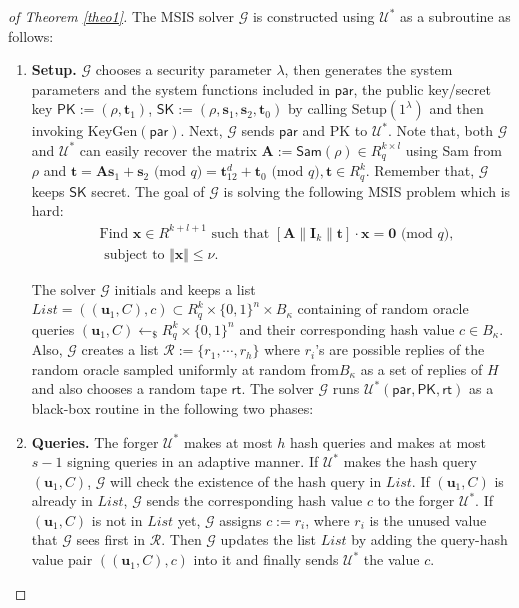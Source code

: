 \documentclass[conference]{IEEEtran}
\newtheorem{proof}{Proof}
\begin{document}
	\begin{proof}[of Theorem \ref{theo1}]
		
		The \textsf{MSIS} solver  $\mathcal{G}$ is constructed using  $\mathcal{U}^*$ as a subroutine as follows:
		\begin{enumerate}
			\item \textbf{Setup.} $\mathcal{G}$ chooses a security parameter $\lambda$, then generates the system parameters and the system functions included in $\mathsf{par}$, the public key/secret key $\textsf{PK}:=(\rho,\mathbf{t}_1)$, $\textsf{SK}:=(\rho,\mathbf{s}_1,\mathbf{s}_2,\mathbf{t}_0)$ by calling \textsf{Setup}$(1^{\lambda})$  and  then invoking \textsf{KeyGen}$(\mathsf{par})$. Next, $\mathcal{G}$ sends $\mathsf{par}$ and \textsf{PK} to $\mathcal{U}^*$. Note that, both $\mathcal{G}$ and $\mathcal{U}^*$ can easily recover the matrix $\mathbf{A}:=\textsf{Sam}(\rho) \in R_q^{k \times l}$ using \textsf{Sam} from $\rho$ and  $\mathbf{t}=\mathbf{A}\mathbf{s}_1+\mathbf{s}_2 \text{ (mod } q)=\mathbf{t}_12^d+\mathbf{t}_0 \text{ (mod } q), \mathbf{t} \in R_q^{k}$. Remember that, $\mathcal{G}$ keeps $\textsf{SK}$ secret.  The goal of $\mathcal{G}$ is solving the following \textsf{MSIS} problem which is hard:
			\begin{equation}\label{k14}
		\begin{split}
			&\text{Find } \mathbf{x}\in R^{k+l+1} \text{ such that } [\mathbf{A}\|\mathbf{I}_{k}\|\mathbf{t}]\cdot \mathbf{x}=\textbf{0} \text{ (mod } q),\\
			& \text{ subject to } \Vert \mathbf{x}\Vert \leq \nu.
		\end{split}
			\end{equation}
			
			The solver $\mathcal{G}$ initials and keeps a list $\textit{List}=((\mathbf{u}_1, C), c) \subset R_q^{k} \times \{0,1\}^n\times B_{\kappa}$ containing of random oracle queries $(\mathbf{u}_1, C)\leftarrow_{\$} R_q^{k} \times \{0,1\}^n$ and their corresponding hash value $ c \in B_{\kappa}$. Also,  $\mathcal{G}$ creates a list $\mathcal{R}:=\{r_1, \cdots, r_{h} \}$ where $r_i$'s are possible replies of the random oracle sampled uniformly at random from$B_{\kappa}$ as a set of replies of $H$ and also chooses a random tape $\textsf{rt}$. 
		The solver $\mathcal{G}$ runs $\mathcal{U}^*(\mathsf{par}, \textsf{PK}, \textsf{rt})$ as a black-box routine in the following two phases:
			
			
			\item \textbf{Queries.} The forger $\mathcal{U}^*$ makes at most $h$ hash queries and makes at most $s-1$ signing queries in an adaptive manner. If $\mathcal{U}^*$  makes the hash query $(\mathbf{u}_1, C)$, $\mathcal{G}$  will check the existence of the hash query in $\textit{List}$. If $(\mathbf{u}_1, C)$ is already in $\textit{List}$, $\mathcal{G}$ sends the corresponding hash value $c$ to the forger $\mathcal{U}^*$. If $(\mathbf{u}_1, C)$ is not in $\textit{List}$ yet, $\mathcal{G}$ assigns $c:=r_i$, where $r_i$ is the unused value that $\mathcal{G}$ sees first in $\mathcal{R}$. Then $\mathcal{G}$ updates the list $\textit{List}$ by adding the query-hash value pair $((\mathbf{u}_1, C), c)$ into it and finally sends $\mathcal{U}^*$ the value $c$. 
			

\end{enumerate}
\end{proof}
\end{document}
